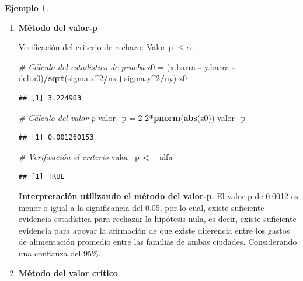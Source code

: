 \documentclass[
  11pt,
]{book}
\newenvironment{Shaded}{\begin{snugshade}}{\end{snugshade}}
\newcommand{\CommentTok}[1]{\textcolor[rgb]{0.56,0.35,0.01}{\textit{#1}}}
\newcommand{\DecValTok}[1]{\textcolor[rgb]{0.00,0.00,0.81}{#1}}
\newcommand{\FunctionTok}[1]{\textcolor[rgb]{0.13,0.29,0.53}{\textbf{#1}}}
\newcommand{\NormalTok}[1]{#1}
\newcommand{\OtherTok}[1]{\textcolor[rgb]{0.56,0.35,0.01}{#1}}
\newcommand{\SpecialCharTok}[1]{\textcolor[rgb]{0.81,0.36,0.00}{\textbf{#1}}}
\theoremstyle{definition}
\theoremstyle{definition}
\newtheorem{example}{Ejemplo}[chapter]
\theoremstyle{definition}
\theoremstyle{definition}
\theoremstyle{remark}
\begin{document}
\begin{example}
\begin{enumerate}
\def\labelenumi{\arabic{enumi}.}
\item
  \textbf{Método del valor-p}

  Verificación del criterio de rechazo: Valor-p \(\leq \alpha\).

\begin{Shaded}
\begin{Highlighting}[]
\CommentTok{\# Cálculo del estadístico de prueba}
\NormalTok{z0 }\OtherTok{=}\NormalTok{ (x.barra }\SpecialCharTok{{-}}\NormalTok{ y.barra }\SpecialCharTok{{-}}\NormalTok{ delta0)}\SpecialCharTok{/}\FunctionTok{sqrt}\NormalTok{(sigma.x}\SpecialCharTok{\^{}}\DecValTok{2}\SpecialCharTok{/}\NormalTok{nx}\SpecialCharTok{+}\NormalTok{sigma.y}\SpecialCharTok{\^{}}\DecValTok{2}\SpecialCharTok{/}\NormalTok{ny)}
\NormalTok{z0}
\end{Highlighting}
\end{Shaded}

\begin{verbatim}
## [1] 3.224903
\end{verbatim}

\begin{Shaded}
\begin{Highlighting}[]
\CommentTok{\# Cálculo del valor{-}p}
\NormalTok{valor\_p }\OtherTok{=} \DecValTok{2{-}2}\SpecialCharTok{*}\FunctionTok{pnorm}\NormalTok{(}\FunctionTok{abs}\NormalTok{(z0))}
\NormalTok{valor\_p}
\end{Highlighting}
\end{Shaded}

\begin{verbatim}
## [1] 0.001260153
\end{verbatim}

\begin{Shaded}
\begin{Highlighting}[]
\CommentTok{\# Verificación el criterio}
\NormalTok{valor\_p }\SpecialCharTok{\textless{}=}\NormalTok{ alfa}
\end{Highlighting}
\end{Shaded}

\begin{verbatim}
## [1] TRUE
\end{verbatim}

  \textbf{Interpretación utilizando el método del valor-p}: El valor-p de 0.0012 es menor o igual a la significancia del 0.05, por lo cual, existe suficiente evidencia estadística para rechazar la hipótesis nula, es decir, existe suficiente evidencia para apoyar la afirmación de que existe diferencia entre los gastos de alimentación promedio entre las familias de ambas ciudades. Considerando una confianza del 95\%.
\item
  \textbf{Método del valor crítico}


\end{enumerate}
\end{example}
\end{document}
